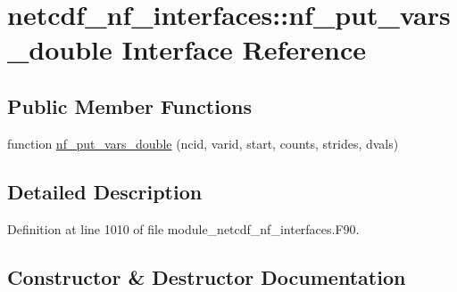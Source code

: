 \hypertarget{interfacenetcdf__nf__interfaces_1_1nf__put__vars__double}{}\section{netcdf\+\_\+nf\+\_\+interfaces\+:\+:nf\+\_\+put\+\_\+vars\+\_\+double Interface Reference}
\label{interfacenetcdf__nf__interfaces_1_1nf__put__vars__double}
\subsection*{Public Member Functions}
\begin{DoxyCompactItemize}
\item 
function \hyperlink{interfacenetcdf__nf__interfaces_1_1nf__put__vars__double_aa89fdeb3d0a328ac9581808d027fd251}{nf\+\_\+put\+\_\+vars\+\_\+double} (ncid, varid, start, counts, strides, dvals)
\end{DoxyCompactItemize}


\subsection{Detailed Description}


Definition at line 1010 of file module\+\_\+netcdf\+\_\+nf\+\_\+interfaces.\+F90.



\subsection{Constructor \& Destructor Documentation}
\mbox{\label{interfacenetcdf__nf__interfaces_1_1nf__put__vars__double_aa89fdeb3d0a328ac9581808d027fd251}} 
